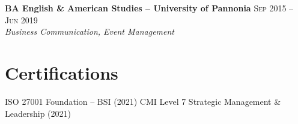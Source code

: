 \documentclass{simpleresume}
\begin{document}
\vspace{0.04cm}
\noindent\textbf{BA English \& American Studies -- University of Pannonia}
  \hfill{\sffamily\scshape\small\color{muted}Sep 2015 -- Jun 2019}\\
  {\itshape\color{secondary}Business Communication, Event Management}

\section{Certifications}
\noindent
{\sffamily\small\color{secondary}
  ISO 27001 Foundation -- BSI (2021) \quad\textbullet\quad
  CMI Level 7 Strategic Management \& Leadership (2021)
}
\end{document}
